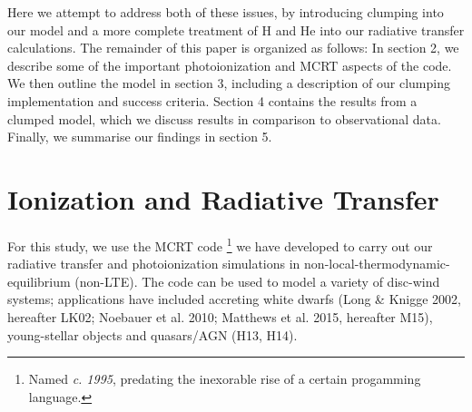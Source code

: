 \documentclass[useAMS,usenatbib]{mn2e_x}
\begin{document}
Here we attempt to address both of these issues, by introducing clumping into our model and a more complete treatment of H and He into our radiative transfer calculations.   The remainder of this paper is organized as follows:
In section 2, we describe some of the important photoionization 
and MCRT aspects of the code. We then outline the model in section 3, including 
a description of our clumping implementation and success criteria. 
Section 4 contains the results from a clumped model, which we discuss results
in comparison to observational data. Finally, we summarise our findings in section 5.





\section{Ionization and Radiative Transfer}

For this study, we use the MCRT code \py 
\footnote{Named {\sl c. 1995}, predating the inexorable rise of a certain progamming language.} we have developed to carry out our 
radiative transfer and photoionization simulations in non-local-thermodynamic-equilibrium 
(non-LTE). The code can be used to model a variety of
disc-wind systems; applications have included accreting white dwarfs 
(Long \& Knigge 2002, hereafter LK02; Noebauer et al. 2010; 
Matthews et al. 2015, hereafter M15), young-stellar objects 
\citep{simmacro2005} and quasars/AGN (H13, H14).\nocite{noebauer, M15, LK02}  
\end{document}
